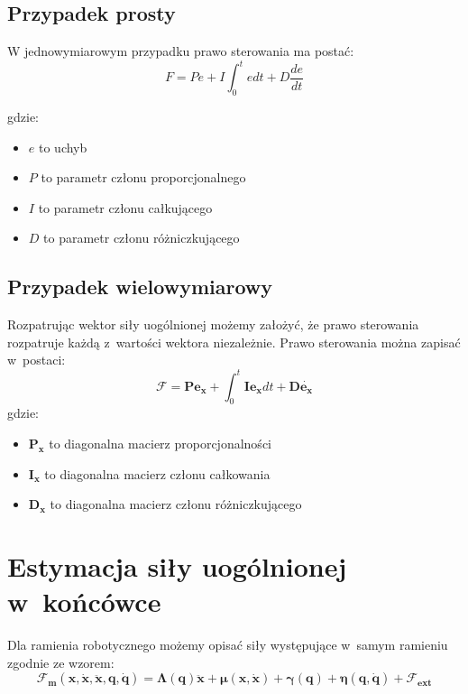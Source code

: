 \subsection{Przypadek prosty}
W jednowymiarowym przypadku prawo sterowania ma postać:
\begin{equation}
F = Pe + I\int_{0}^{t}e dt + D\frac{de}{dt}
\end{equation}

gdzie:
\begin{itemize}
	\item $e$ to uchyb
	\item $P$ to parametr członu proporcjonalnego
	\item $I$ to parametr członu całkującego
	\item $D$ to parametr członu różniczkującego
\end{itemize}


\subsection{Przypadek wielowymiarowy}
Rozpatrując wektor siły uogólnionej możemy założyć, że prawo sterowania rozpatruje każdą z~wartości wektora niezależnie. Prawo sterowania można zapisać w~postaci:
\begin{equation}
\boldsymbol{\mathcal{F}} = \boldsymbol{P}\boldsymbol{e_x} +\int_{0}^{t}  \boldsymbol{I}\boldsymbol{e_x}dt + \boldsymbol{D}\dot{\boldsymbol{e_x}}
\end{equation}
gdzie:
\begin{itemize}
	\item $\boldsymbol{P_x}$ to diagonalna macierz proporcjonalności
	\item $\boldsymbol{I_x}$ to diagonalna macierz członu całkowania
	\item $\boldsymbol{D_x}$ to diagonalna macierz członu różniczkującego
\end{itemize}

\section{Estymacja siły uogólnionej w~końcówce}
Dla ramienia robotycznego możemy opisać siły występujące w~samym ramieniu zgodnie ze wzorem:
\begin{equation}
\boldsymbol{\mathcal{F}_m}(\boldsymbol{x}, \dot{\boldsymbol{x}}, \ddot{\boldsymbol{x}}, \boldsymbol{q}, \dot{\boldsymbol{q}}) = \boldsymbol{\Lambda}(\boldsymbol{q})\boldsymbol{\ddot{x}} + \boldsymbol{\mu}(\boldsymbol{x}, \boldsymbol{\dot{x}}) + \boldsymbol{\gamma}(\boldsymbol{q}) + \boldsymbol{\eta}(\boldsymbol{q}, \boldsymbol{\dot{q}}) + \boldsymbol{\mathcal{F}_{ext}}
\label{eq:ramie}
\end{equation}


